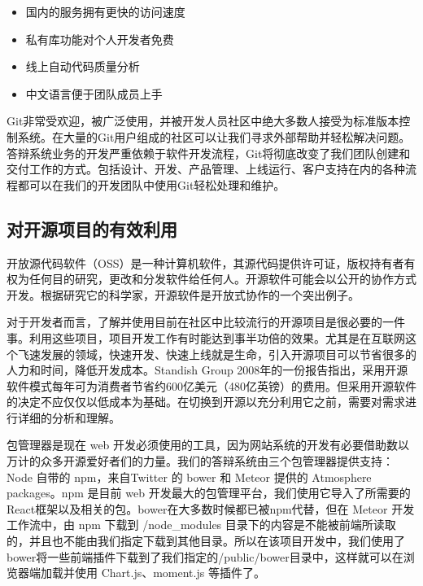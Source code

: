 \begin{itemize}
	\item 国内的服务拥有更快的访问速度
	\item 私有库功能对个人开发者免费
	\item 线上自动代码质量分析
	\item 中文语言便于团队成员上手
\end{itemize}

Git非常受欢迎，被广泛使用，并被开发人员社区中绝大多数人接受为标准版本控制系统。在大量的Git用户组成的社区可以让我们寻求外部帮助并轻松解决问题。答辩系统业务的开发严重依赖于软件开发流程，Git将彻底改变了我们团队创建和交付工作的方式。包括设计、开发、产品管理、上线运行、客户支持在内的各种流程都可以在我们的开发团队中使用Git轻松处理和维护。


\subsection{对开源项目的有效利用}

开放源代码软件（OSS）是一种计算机软件，其源代码提供许可证，版权持有者有权为任何目的研究，更改和分发软件给任何人。开源软件可能会以公开的协作方式开发。根据研究它的科学家，开源软件是开放式协作的一个突出例子。

对于开发者而言，了解并使用目前在社区中比较流行的开源项目是很必要的一件事。利用这些项目，项目开发工作有时能达到事半功倍的效果。尤其是在互联网这个飞速发展的领域，快速开发、快速上线就是生命，引入开源项目可以节省很多的人力和时间，降低开发成本。Standish Group 2008年的一份报告指出，采用开源软件模式每年可为消费者节省约600亿美元（480亿英镑）的费用。但采用开源软件的决定不应仅仅以低成本为基础。在切换到开源以充分利用它之前，需要对需求进行详细的分析和理解。

包管理器是现在 web 开发必须使用的工具，因为网站系统的开发有必要借助数以万计的众多开源爱好者们的力量。我们的答辩系统由三个包管理器提供支持：Node 自带的 npm，来自Twitter 的 bower 和 Meteor 提供的 Atmosphere  packages。npm 是目前 web 开发最大的包管理平台，我们使用它导入了所需要的 React框架以及相关的包。bower在大多数时候都已被npm代替，但在 Meteor 开发工作流中，由 npm 下载到 /node\_modules 目录下的内容是不能被前端所读取的，并且也不能由我们指定下载到其他目录。所以在该项目开发中，我们使用了bower将一些前端插件下载到了我们指定的/public/bower目录中，这样就可以在浏览器端加载并使用 Chart.js、moment.js 等插件了。

